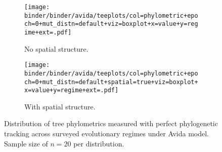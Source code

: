 \begin{figure*}
  \centering
  \begin{subfigure}[b]{\textwidth}
    \texttt{[image: binder/binder/avida/teeplots/col=phylometric+epoch=0+mut\_distn=default+viz=boxplot+x=value+y=regime+ext=.pdf]}
    \caption{No spatial structure.}
  \end{subfigure}
  \vspace{1cm}
  \begin{subfigure}[b]{\textwidth}
  \texttt{[image: binder/binder/avida/teeplots/col=phylometric+epoch=0+mut\_distn=default+spatial=true+viz=boxplot+x=value+y=regime+ext=.pdf]}
    \caption{With spatial structure.}
  \end{subfigure}
  \caption{%
    Distribution of tree phylometrics measured with perfect phylogenetic tracking across surveyed evolutionary regimes under Avida model.
    Sample size of $n=20$ per distribution.
  }
  \label{fig:perfect-tree-phylometrics-avida}
\end{figure*}
